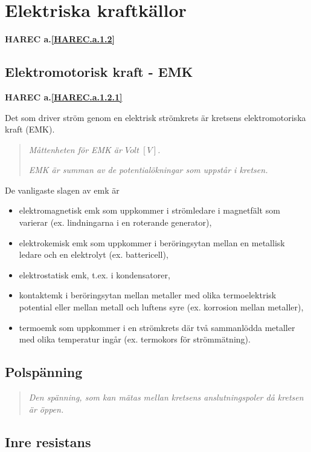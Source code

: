\section{Elektriska kraftkällor}
\textbf{HAREC a.\ref{HAREC.a.1.2}\label{myHAREC.a.1.2}}

\subsection{Elektromotorisk kraft - EMK}
\textbf{HAREC a.\ref{HAREC.a.1.2.1}\label{myHAREC.a.1.2.1}}

Det som driver ström genom en elektrisk strömkrets är kretsens elektromotoriska
kraft (EMK).

\begin{quote}
\emph{Måttenheten för EMK är \(Volt\ [V]\).}

\emph{EMK är summan av de potentialökningar som uppstår i kretsen.}
\end{quote}

De vanligaste slagen av emk är
\begin{itemize}
\item elektromagnetisk emk som uppkommer i strömledare i magnetfält som
varierar (ex. lindningarna i en roterande generator),
\item elektrokemisk emk som uppkommer i beröringsytan mellan en metallisk
ledare och en elektrolyt (ex. battericell),
\item elektrostatisk emk, t.ex. i kondensatorer,
\item kontaktemk i beröringsytan mellan metaller med olika termoelektrisk
potential eller mellan metall och luftens syre (ex. korrosion mellan metaller),
\item termoemk som uppkommer i en strömkrets där två sammanlödda metaller med
olika temperatur ingår (ex. termokors för strömmätning).
\end{itemize}

\subsection{Polspänning}

\begin{quote}\emph{
Den spänning, som kan mätas mellan kretsens anslutningspoler då kretsen är öppen.
}\end{quote}

\subsection{Inre resistans}

